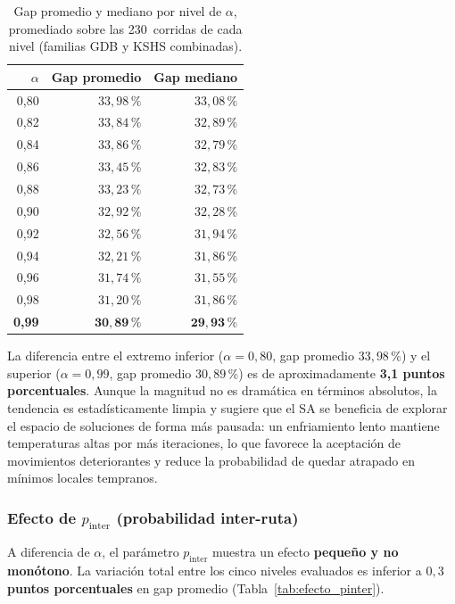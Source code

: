 \begin{table}[htbp]
  \centering
  \caption{%
    Gap promedio y mediano por nivel de \(\alpha\), promediado sobre las
    230~corridas de cada nivel (familias GDB y KSHS combinadas).%
  }
  \label{tab:efecto_alpha}
  \begin{tabular}{r r r}
    \toprule
    \(\alpha\) & Gap promedio & Gap mediano \\
    \midrule
    0{,}80 & \(33{,}98\,\%\) & \(33{,}08\,\%\) \\
    0{,}82 & \(33{,}84\,\%\) & \(32{,}89\,\%\) \\
    0{,}84 & \(33{,}86\,\%\) & \(32{,}79\,\%\) \\
    0{,}86 & \(33{,}45\,\%\) & \(32{,}83\,\%\) \\
    0{,}88 & \(33{,}23\,\%\) & \(32{,}73\,\%\) \\
    0{,}90 & \(32{,}92\,\%\) & \(32{,}28\,\%\) \\
    0{,}92 & \(32{,}56\,\%\) & \(31{,}94\,\%\) \\
    0{,}94 & \(32{,}21\,\%\) & \(31{,}86\,\%\) \\
    0{,}96 & \(31{,}74\,\%\) & \(31{,}55\,\%\) \\
    0{,}98 & \(31{,}20\,\%\) & \(31{,}86\,\%\) \\
    \textbf{0{,}99} & \(\mathbf{30{,}89\,\%}\) & \(\mathbf{29{,}93\,\%}\) \\
    \bottomrule
  \end{tabular}
\end{table}

La diferencia entre el extremo inferior (\(\alpha = 0{,}80\), gap promedio \(33{,}98\,\%\))
y el superior (\(\alpha = 0{,}99\), gap promedio \(30{,}89\,\%\)) es de aproximadamente
\textbf{3{,}1 puntos porcentuales}. Aunque la magnitud no es dramática en términos
absolutos, la tendencia es estadísticamente limpia y sugiere que el SA se beneficia de
explorar el espacio de soluciones de forma más pausada: un enfriamiento lento mantiene
temperaturas altas por más iteraciones, lo que favorece la aceptación de movimientos
deteriorantes y reduce la probabilidad de quedar atrapado en mínimos locales tempranos.

\subsubsection{Efecto de \texorpdfstring{$p_{\text{inter}}$}{p\_inter} (probabilidad inter-ruta)}
\label{subsubsec:efecto_pinter}

A diferencia de \(\alpha\), el parámetro \(p_{\text{inter}}\) muestra un efecto
\textbf{pequeño y no monótono}. La variación total entre los cinco niveles evaluados es
inferior a \textbf{\(0{,}3\) puntos porcentuales} en gap promedio
(Tabla~\ref{tab:efecto_pinter}).

